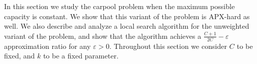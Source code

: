In this section we study the carpool problem when the maximum possible capacity
is constant.
We show that this variant of the problem is APX-hard as well.
We also describe and analyze a local search algorithm for the unweighted
variant of the problem, 
and show that the algorithm achieves a 
$\frac{C + 1}{2C} - \varepsilon$ approximation ratio for any $\varepsilon > 0$.
Throughout this section we consider $C$ to be fixed, and $k$ to be a fixed parameter.  

